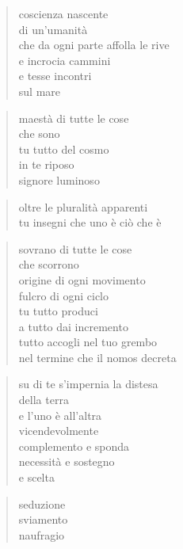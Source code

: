 	\begin{verse}
		coscienza nascente\\
		di un’umanità\\
		che da ogni parte affolla le rive\\
		e incrocia cammini\\
		e tesse incontri\\
		sul mare
	\end{verse}

\clearpage



	\begin{verse}
		maestà di tutte le cose\\
		che sono\\
		tu tutto del cosmo\\
		in te riposo\\
		signore luminoso
	\end{verse}

	\begin{verse}
		oltre le pluralità apparenti\\
		tu insegni che uno è ciò che è
	\end{verse}

	\begin{verse}
		sovrano di tutte le cose\\
		che scorrono\\
		origine di ogni movimento\\
		fulcro di ogni ciclo\\
		tu tutto produci\\
		a tutto dai incremento\\
		tutto accogli nel tuo grembo\\
		nel termine che il nomos decreta
	\end{verse}

	\begin{verse}
		su di te s’impernia la distesa\\
		della terra\\
		e l’uno è all’altra\\
		vicendevolmente\\
		complemento e sponda\\
		necessità e sostegno\\
		e scelta
	\end{verse}

\clearpage



	\begin{verse}
		seduzione\\
		sviamento\\
		naufragio
	\end{verse}

